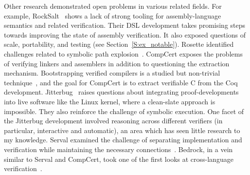 Other research demonstrated open problems in various related fields. For
example, RockSalt~\cite{Morrisett_2012} shows a lack of strong tooling for
assembly-language semantics and related verification. Their DSL development
takes promising steps towards improving the state of assembly verification. It
also exposed questions of scale, portability, and testing (see
Section~\ref{S:ex_notable}). Rosette identified challenges related to symbolic
path explosion~\cite{Bornholt_2018,Porncharoenwase_2020}. CompCert exposes the
problems of verifying linkers and assemblers in addition to questioning the
extraction mechanism. Bootstrapping verified compilers is a studied but
non-trivial technique~\cite{Konat_2016,Myreen_2021}, and the goal for CompCert
is to extract verifiable C from the Coq development. Jitterbug~\cite{258848}
raises questions about integrating proof-developments into live software like
the Linux kernel, where a clean-slate approach is impossible. They also
reinforce the challenge of symbolic execution. One facet of the Jitterbug
development involved reasoning across different verifiers (in particular,
interactive and automatic), an area which has seen little research to my
knowledge. Serval examined the challenge of separating implementation and
verification while maintaining the necessary connections~\cite{Nelson_2019}.
Bedrock, in a vein similar to Serval and CompCert, took one of the first looks
at cross-language verification~\cite{Wang_2014}.
